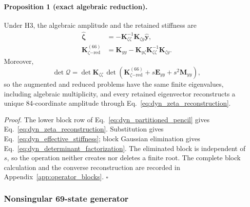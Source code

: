 \paragraph{Proposition 1 (exact algebraic reduction).}
Under H3, the algebraic amplitude and the retained stiffness are
\begin{align}
 \widehat{\boldsymbol\zeta}
 &=-\boldsymbol K_{\zeta\zeta}^{-1}
       \boldsymbol K_{\zeta y}\widehat{\boldsymbol y},
 \label{eq:dyn_zeta_reconstruction}\\
 \boldsymbol K_{\zeta\mathrm{-red}}^{(66)}
 &=\boldsymbol K_{yy}
   -\boldsymbol K_{y\zeta}\boldsymbol K_{\zeta\zeta}^{-1}
    \boldsymbol K_{\zeta y}.
 \label{eq:dyn_effective_stiffness}
\end{align}
Moreover,
\begin{equation}
 \det\boldsymbol{\mathcal Q}
 =\det\boldsymbol K_{\zeta\zeta}\,
  \det\!\left(
    \boldsymbol K_{\zeta\mathrm{-red}}^{(66)}
    +s\boldsymbol E_{yy}+s^2\boldsymbol M_{yy}
  \right),
 \label{eq:dyn_determinant_factorization}
\end{equation}
so the augmented and reduced problems have the same finite eigenvalues,
including algebraic multiplicity, and every retained eigenvector reconstructs
a unique 84-coordinate amplitude through Eq.~\eqref{eq:dyn_zeta_reconstruction}.

\emph{Proof.}
The lower block row of Eq.~\eqref{eq:dyn_partitioned_pencil} gives
Eq.~\eqref{eq:dyn_zeta_reconstruction}.  Substitution gives
Eq.~\eqref{eq:dyn_effective_stiffness}; block Gaussian elimination gives
Eq.~\eqref{eq:dyn_determinant_factorization}.  The eliminated block is
independent of $s$, so the operation neither creates nor deletes a finite root.
The complete block calculation and the converse reconstruction are recorded in
Appendix~\ref{app:operator_blocks}. \hfill$\square$

\subsubsection{Nonsingular 69-state generator}

